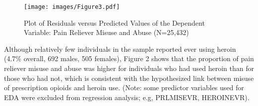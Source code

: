 \documentclass[sigconf]{acmart}
\begin{document}
\begin{figure}[!ht]
  \centering\texttt{[image: images/Figure3.pdf]}
  \caption{Plot of Residuals versus Predicted Values of the Dependent Variable: 
  Pain Reliever Misuse and Abuse (N=25,432)}
  \label{f:Figure3}
\end{figure}


Although relatively few individuals in the sample reported ever using heroin 
(4.7\% overall, 692 males, 505 females), Figure 2 shows that the proportion of 
pain reliever misuse and abuse was higher for individuals who had used heroin 
than for those who had not, which is consistent with the hypothesized link 
between misuse of prescription opioids and heroin use. (Note: some predictor 
variables used for EDA were excluded from regression analysis;
e.g, PRLMISEVR, HEROINEVR). 
\end{document}
